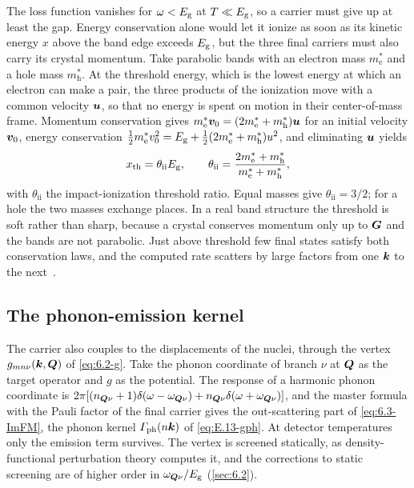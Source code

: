The loss function vanishes for $\omega < E_{\mathrm{g}}$ at $T \ll E_{\mathrm{g}}$, so a carrier must give up at least the gap. Energy conservation alone would let it ionize as soon as its kinetic energy $x$ above the band edge exceeds $E_{\mathrm{g}}$, but the three final carriers must also carry its crystal momentum. Take parabolic bands with an electron mass $m^*_{\mathrm{e}}$ and a hole mass $m^*_{\mathrm{h}}$. At the threshold energy, which is the lowest energy at which an electron can make a pair, the three products of the ionization move with a common velocity $\bm{u}$, so that no energy is spent on motion in their center-of-mass frame. Momentum conservation gives $m^*_{\mathrm{e}}\bm{v}_0 = (2m^*_{\mathrm{e}} + m^*_{\mathrm{h}})\bm{u}$ for an initial velocity $\bm{v}_0$, energy conservation $\tfrac12m^*_{\mathrm{e}}v_0^2 = E_{\mathrm{g}} + \tfrac12(2m^*_{\mathrm{e}} + m^*_{\mathrm{h}})u^2$, and eliminating $\bm{u}$ yields
\begin{equation}
  x_{\mathrm{th}} = \theta_{\mathrm{ii}}E_{\mathrm{g}} , \qquad \theta_{\mathrm{ii}} = \frac{2m^*_{\mathrm{e}} + m^*_{\mathrm{h}}}{m^*_{\mathrm{e}} + m^*_{\mathrm{h}}} ,
  \label{eq:18.1-theta}
\end{equation}
with $\theta_{\mathrm{ii}}$ the impact-ionization threshold ratio. Equal masses give $\theta_{\mathrm{ii}} = 3/2$; for a hole the two masses exchange places. In a real band structure the threshold is soft rather than sharp, because a crystal conserves momentum only up to $\bm{G}$ and the bands are not parabolic. Just above threshold few final states satisfy both conservation laws, and the computed rate scatters by large factors from one $\bm{k}$ to the next~\cite[Fig.~2]{kotani2010impact}.

\subsection{The phonon-emission kernel}\label{sec:18.1-ph}

The carrier also couples to the displacements of the nuclei, through the vertex $g_{mn\nu}(\bm{k},\bm{Q})$ of \cref{eq:6.2-g}. Take the phonon coordinate of branch $\nu$ at $\bm{Q}$ as the target operator and $g$ as the potential. The response of a harmonic phonon coordinate is $2\pi[(n_{\bm{Q}\nu} + 1)\delta(\omega - \omega_{\bm{Q}\nu}) + n_{\bm{Q}\nu}\delta(\omega + \omega_{\bm{Q}\nu})]$, and the master formula with the Pauli factor of the final carrier gives the out-scattering part of \cref{eq:6.3-ImFM}, the phonon kernel $\varGamma_{\mathrm{ph}}(n\bm{k})$ of \cref{eq:E.13-gph}. At detector temperatures only the emission term survives. The vertex is screened statically, as density-functional perturbation theory computes it, and the corrections to static screening are of higher order in $\omega_{\bm{Q}\nu}/E_{\mathrm{g}}$ (\cref{sec:6.2}).

